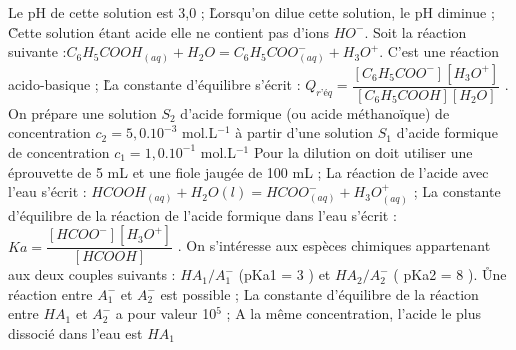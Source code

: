 \rv
  Le pH de cette solution est 3,0 ;
\r
  Lorsqu’on dilue cette solution, le pH diminue ;
\r
  Cette solution étant acide elle ne contient pas d’ions $HO^{-}$.
  \q	
  Soit la réaction suivante :$C_6H_5COOH_{(aq)} + H_2O  = C_6H_5COO^{-}_{(aq)} + H_3O^{+}$.   
\rv
  C’est une réaction acido-basique ;
\r
  La constante d’équilibre s’écrit : $Q_{r’éq} =\dfrac{[C_6H_5COO^{-}][H_3O^{+}]}{[C_6H_5COOH][H_2O]}$   .
   \q	
   On prépare une solution $S_2$ d’acide formique (ou acide méthanoïque) de concentration        $c_2 = 5,0 . 10^{-3}$ mol.L$^{-1}$ à partir d’une solution $S_1$ d’acide formique de concentration $c_1 =1,0 . 10^{-1}$ mol.L$^{-1}$ 
\rv
  Pour la dilution on doit utiliser une éprouvette de 5 mL et une fiole jaugée de 100 mL ;
\rv 
 La réaction de l’acide avec l’eau s’écrit :
$HCOOH_{(aq)}+H_2O(l) = HCOO^{-} _{(aq)}+ H_3O^+ _{(aq)}$ ;
\rv
  La constante d’équilibre de la réaction de l’acide formique dans l’eau s’écrit :
		$Ka=\dfrac{[HCOO^{-}][H_3O^+]}{[HCOOH]}$   .
 \q	
 On s’intéresse aux espèces chimiques appartenant aux deux couples suivants :
$HA_1/A_1^-$ (pKa1 = 3 ) et $HA_2/A_2^-$ ( pKa2 = 8 ).
\r
  Une réaction entre $A_1^-$ et $A_2^-$ est possible ;
\rv 
  La constante d’équilibre de la réaction entre $HA_1$ et $A_2^-$ a pour valeur 10$^{5}$ ;
\rv
  A la même concentration, l’acide le plus dissocié dans l’eau est $HA_1$ 
